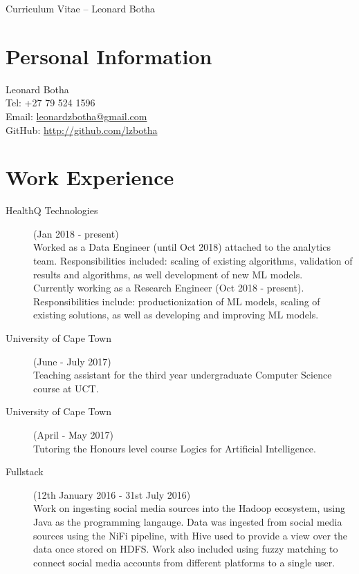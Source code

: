 \documentclass[margin,line,a4paper]{resume}
\begin{document}
    {\sc \Large Curriculum Vitae -- Leonard Botha}
    \begin{resume}
        \vspace{0.5cm}

        \section{\mysidestyle Personal Information}
            Leonard Botha\\
            Tel: +27 79 524 1596\\
            Email: \href{mailto:leonardzbotha@gmail.com}{leonardzbotha@gmail.com}\\
            GitHub: \href{http://github.com/lzbotha}{http://github.com/lzbotha}\\

        \section{\mysidestyle Work Experience}
            \begin{description}
            	\item[HealthQ Technologies] (Jan 2018 - present) \\
                    Worked as a Data Engineer (until Oct 2018) attached to the analytics team. Responsibilities included: scaling of existing algorithms, validation of results and algorithms, as well development of new ML models. \\
                    Currently working as a Research Engineer (Oct 2018 - present). Responsibilities include: productionization of ML models, scaling of existing solutions, as well as developing and improving ML models.

            	\item[University of Cape Town] (June - July 2017) \\
            		Teaching assistant for the third year undergraduate Computer Science course at UCT.

            	\item[University of Cape Town] (April - May 2017) \\
            		Tutoring the Honours level course Logics for Artificial Intelligence.

                \item[Fullstack] (12th January 2016 - 31st July 2016) \\
                    Work on ingesting social media sources into the Hadoop ecosystem, using Java as the programming langauge. Data was ingested from social media sources using the NiFi pipeline, with Hive used to provide a view over the data once stored on HDFS. Work also included using fuzzy matching to connect social media accounts from different platforms to a single user. 


\end{description}
\end{resume}
\end{document}
